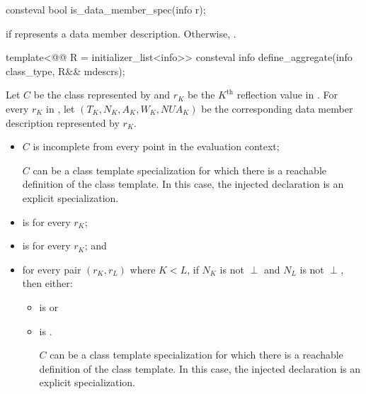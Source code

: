%
\begin{itemdecl}
consteval bool is_data_member_spec(info r);
\end{itemdecl}

\begin{itemdescr}
\pnum
\returns
{} if  represents a data member description.
Otherwise, .
\end{itemdescr}

%
\begin{itemdecl}
template<@@ R = initializer_list<info>>
  consteval info define_aggregate(info class_type, R&& mdescrs);
\end{itemdecl}

\begin{itemdescr}
\pnum
Let $C$ be the class represented by 
and $r_K$ be the $K^\text{th}$ reflection value in .
For every $r_K$ in ,
let $(T_K, N_K, A_K, W_K, \mathit{NUA}_K)$ be
the corresponding data member description represented by $r_K$.

\pnum
\constantwhen
\begin{itemize}
\item
  $C$ is incomplete from every point in the evaluation context;
  \begin{note}
  $C$ can be a class template specialization
  for which there is a reachable definition of the class template.
  In this case,
  the injected declaration is an explicit specialization.
  \end{note}
\item
   is  for every $r_K$;
\item
   is  for every $r_K$; and
\item
  for every pair $(r_K, r_L)$ where $K < L$,
  if $N_K$ is not $\perp$ and $N_L$ is not $\perp$,
  then either:
  \begin{itemize}
  \item
     is  or
  \item
     is .
    \begin{note}
    $C$ can be a class template specialization
    for which there is a reachable definition of the class template.
    In this case,
    the injected declaration is an explicit specialization.
    \end{note}
  \end{itemize}
\end{itemize}


\end{itemdescr}
